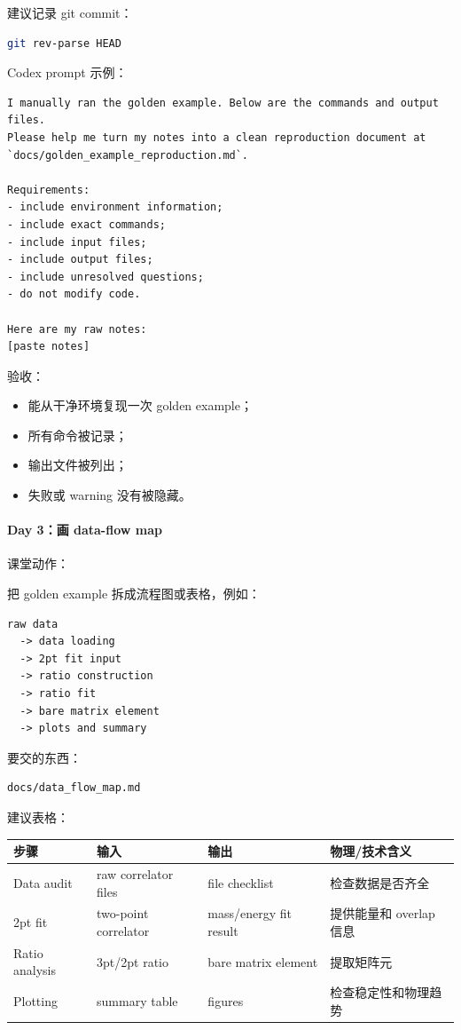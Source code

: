 \documentclass[11pt,a4paper,fontset=fandol]{ctexart}
\begin{document}
建议记录 git commit：

\begin{lstlisting}[language=bash]
git rev-parse HEAD
\end{lstlisting}

Codex prompt 示例：

\begin{lstlisting}
I manually ran the golden example. Below are the commands and output files.
Please help me turn my notes into a clean reproduction document at `docs/golden_example_reproduction.md`.

Requirements:
- include environment information;
- include exact commands;
- include input files;
- include output files;
- include unresolved questions;
- do not modify code.

Here are my raw notes:
[paste notes]
\end{lstlisting}

验收：

\begin{itemize}[leftmargin=2em]
  \item 能从干净环境复现一次 golden example；
  \item 所有命令被记录；
  \item 输出文件被列出；
  \item 失败或 warning 没有被隐藏。
\end{itemize}

\paragraph{Day 3：画 data-flow map}

课堂动作：

把 golden example 拆成流程图或表格，例如：

\begin{lstlisting}
raw data
  -> data loading
  -> 2pt fit input
  -> ratio construction
  -> ratio fit
  -> bare matrix element
  -> plots and summary
\end{lstlisting}

要交的东西：

\begin{lstlisting}
docs/data_flow_map.md
\end{lstlisting}

建议表格：

\begin{longtable}{p{}p{}p{}p{}}
\toprule
步骤 & 输入 & 输出 & 物理/技术含义 \\
\midrule
Data audit & raw correlator files & file checklist & 检查数据是否齐全 \\
2pt fit & two-point correlator & mass/energy fit result & 提供能量和 overlap 信息 \\
Ratio analysis & 3pt/2pt ratio & bare matrix element & 提取矩阵元 \\
Plotting & summary table & figures & 检查稳定性和物理趋势 \\
\bottomrule
\end{longtable}
\end{document}
